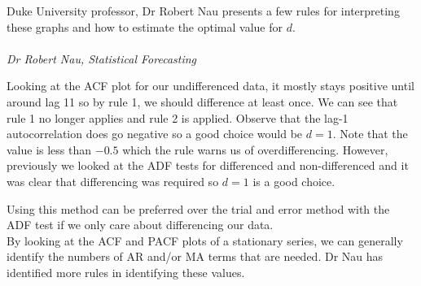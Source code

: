 \documentclass{article}
\begin{document}
  Duke University professor, Dr Robert Nau presents a few rules for interpreting these graphs and how to estimate the optimal value for $d$.
  \newline
  \newline
  \emph{\\
  \\
  Dr Robert Nau, Statistical Forecasting}
  \newline

  Looking at the ACF plot for our undifferenced data, it mostly stays positive until around lag 11 so by rule 1, we should difference at least once. We can see that rule 1 no longer applies and rule 2 is applied. Observe that the lag-1 autocorrelation does go negative so a good choice would be $d=1$. Note that the value is less than $-0.5$ which the rule warns us of overdifferencing. However, previously we looked at the ADF tests for differenced and non-differenced and it was clear that differencing was required so $d=1$ is a good choice.

  Using this method can be preferred over the trial and error method with the ADF test if we only care about differencing our data.\\
  By looking at the ACF and PACF plots of a stationary series, we can generally identify the numbers of AR and/or MA terms that are needed. Dr Nau has identified more rules in identifying these values.
  \newline
  \newline
  \emph{\\
  }
  \newline
\end{document}
